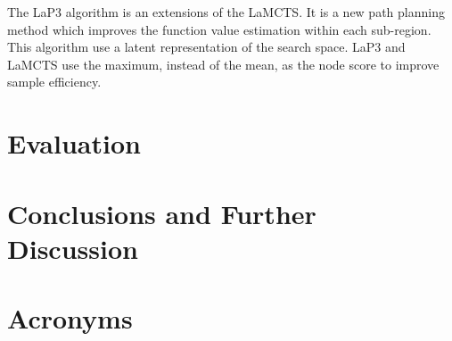 \documentclass[bibliography=totoc]{scrartcl}
\begin{document}
The \ac{LaP3} algorithm is an extensions of the LaMCTS. \cite{NEURIPS2021_03a3655f}
It is a new path planning method which improves the function value estimation within each sub-region.
This algorithm use a latent representation of the search space.
\ac{LaP3} and \ac{LaMCTS} use the maximum, instead of the mean, as the node score to improve sample efficiency.

\section{Evaluation}


\section{Conclusions and Further Discussion}


\clearpage


\section*{Acronyms} 

\begin{acronym}[....]
\end{acronym}



\end{document}
